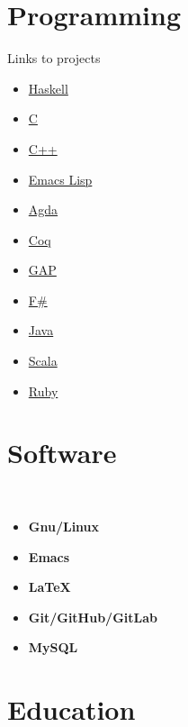 \documentclass[nocolors]{friggeri-cv-a4}
\begin{document}
\begin{aside}
\section{Programming}
{\small Links to projects \begin{itemize}
  \item \href{https://github.com/mroman42/mikrokosmos}{Haskell}
  \item \href{https://github.com/mroman42/granasatClient}{C}
  \item \href{https://github.com/mroman42/programming}{C++}
    \item \href{https://github.com/mroman42/cosmoi-emacs}{Emacs Lisp}
    \item \href{https://github.com/mroman42/ctlc}{Agda}
    \item \href{https://github.com/UniMath/UniMath/commit/e26dacaec4bd1e0b26616fcecc9bba5e507cb941}{Coq}
    \item \href{https://github.com/homalg-project/FinSetsForCAP/pull/24}{GAP}
    \item \href{https://github.com/mroman42/funzionale}{F#}
    \item \href{https://github.com/mroman42/Napakalaki}{Java}
    \item \href{https://github.com/mroman42/linguaggi/blob/master/scala/brainfuck.scala}{Scala}
    \item \href{https://github.com/mroman42/rbNapakalaki}{Ruby}
    \end{itemize}
}

\section{Software}\\
{\small \begin{itemize}
  \item \textbf{Gnu/Linux}
  \item \textbf{Emacs}
  \item \textbf{LaTeX}
  \item \textbf{Git/GitHub/GitLab}
  \item \textbf{MySQL}
  \end{itemize}
}
\end{aside}


\section{Education}
\end{document}

